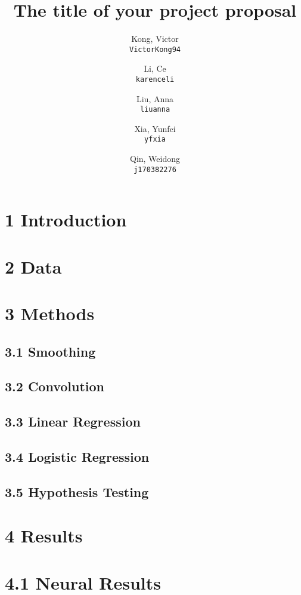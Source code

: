 \documentclass[11pt]{article}
\title{The title of your project proposal}
\author{
  Kong, Victor\\
  \texttt{VictorKong94}
  \and
  Li, Ce\\
  \texttt{karenceli}
  \and
  Liu, Anna\\
  \texttt{liuanna}
  \and
  Xia, Yunfei\\
  \texttt{yfxia}
  \and
  Qin, Weidong\\
  \texttt{j170382276}
}
\begin{document}
\maketitle

\abstract{}

\section{1 Introduction}
        

\section{2 Data}
        

\section{3 Methods}

    \subsection{3.1 Smoothing}
            
    \subsection{3.2 Convolution}
            
    \subsection{3.3 Linear Regression}
            
    \subsection{3.4 Logistic Regression}
                
    \subsection{3.5 Hypothesis Testing}
                
\section{4 Results}

    \section{4.1 Neural Results}
            
\end{document}
